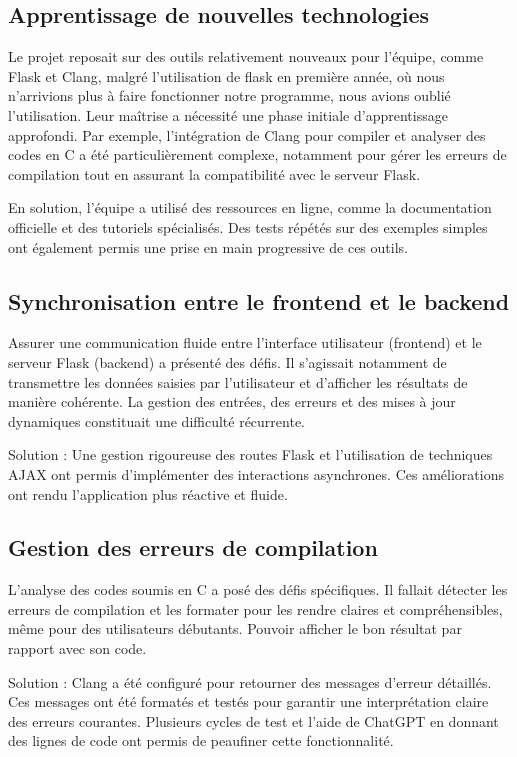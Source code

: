 \documentclass[a4paper, 12pt, twoside]{article}
\begin{document}
\subsection{Apprentissage de nouvelles technologies}
Le projet reposait sur des outils relativement nouveaux pour l’équipe, comme Flask et Clang, malgré l'utilisation de flask en première année, où nous n'arrivions plus à faire fonctionner notre programme, nous avions oublié l'utilisation. Leur maîtrise a nécessité une phase initiale d’apprentissage approfondi. Par exemple, l’intégration de Clang pour compiler et analyser des codes en C a été particulièrement complexe, notamment pour gérer les erreurs de compilation tout en assurant la compatibilité avec le serveur Flask.

En solution, l’équipe a utilisé des ressources en ligne, comme la documentation officielle et des tutoriels spécialisés. Des tests répétés sur des exemples simples ont également permis une prise en main progressive de ces outils.
\vspace{12pt}
\subsection{Synchronisation entre le frontend et le backend}
Assurer une communication fluide entre l’interface utilisateur (frontend) et le serveur Flask (backend) a présenté des défis. Il s’agissait notamment de transmettre les données saisies par l’utilisateur et d’afficher les résultats de manière cohérente. La gestion des entrées, des erreurs et des mises à jour dynamiques constituait une difficulté récurrente.

Solution : Une gestion rigoureuse des routes Flask et l’utilisation de techniques AJAX ont permis d’implémenter des interactions asynchrones. Ces améliorations ont rendu l’application plus réactive et fluide.
\vspace{12pt}
\subsection{Gestion des erreurs de compilation}
L’analyse des codes soumis en C a posé des défis spécifiques. Il fallait détecter les erreurs de compilation et les formater pour les rendre claires et compréhensibles, même pour des utilisateurs débutants. Pouvoir afficher le bon résultat par rapport avec son code.

Solution : Clang a été configuré pour retourner des messages d’erreur détaillés. Ces messages ont été formatés et testés pour garantir une interprétation claire des erreurs courantes. Plusieurs cycles de test et l'aide de ChatGPT en donnant des lignes de code ont permis de peaufiner cette fonctionnalité.
\vspace{100pt}
\end{document}

